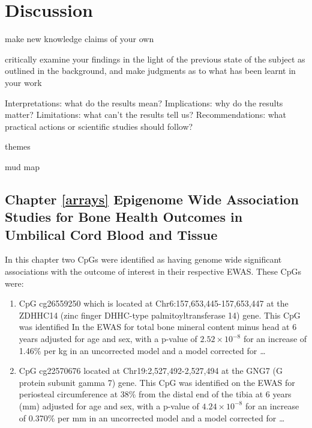 \documentclass[
]{book}
\begin{document}
\hypertarget{discussion}{%
\chapter{Discussion}\label{discussion}}

make new knowledge claims of your own

critically examine your findings in the light of the previous state of the subject as outlined in the background, and make judgments as to what has been learnt in your work

Interpretations: what do the results mean?
Implications: why do the results matter?
Limitations: what can't the results tell us?
Recommendations: what practical actions or scientific studies should follow?

themes

mud map

\hypertarget{chapter-refarrays-epigenome-wide-association-studies-for-bone-health-outcomes-in-umbilical-cord-blood-and-tissue}{%
\section{Chapter \ref{arrays} Epigenome Wide Association Studies for Bone Health Outcomes in Umbilical Cord Blood and Tissue}\label{chapter-refarrays-epigenome-wide-association-studies-for-bone-health-outcomes-in-umbilical-cord-blood-and-tissue}}

In this chapter two CpGs were identified as having genome wide significant associations with the outcome of interest in their respective EWAS.
These CpGs were:

\begin{enumerate}
\def\labelenumi{\arabic{enumi}.}
\item
  CpG cg26559250 which is located at Chr6:157,653,445-157,653,447 at the ZDHHC14 (zinc finger DHHC-type palmitoyltransferase 14) gene. This CpG was identified In the EWAS for total bone mineral content minus head at 6 years adjusted for age and sex, with a p-value of \(2.52\times 10^{-8}\) for an increase of 1.46\% per kg in an uncorrected model and a model corrected for \emph{\ldots{}}
\item
  CpG cg22570676 located at Chr19:2,527,492-2,527,494 at the GNG7 (G protein subunit gamma 7) gene.
  This CpG was identified on the EWAS for periosteal circumference at 38\% from the distal end of the tibia at 6 years (mm) adjusted for age and sex, with a p-value of \(4.24\times 10^{-8}\) for an increase of 0.370\% per mm in an uncorrected model and a model corrected for \emph{\ldots{}}
\end{enumerate}
\end{document}
